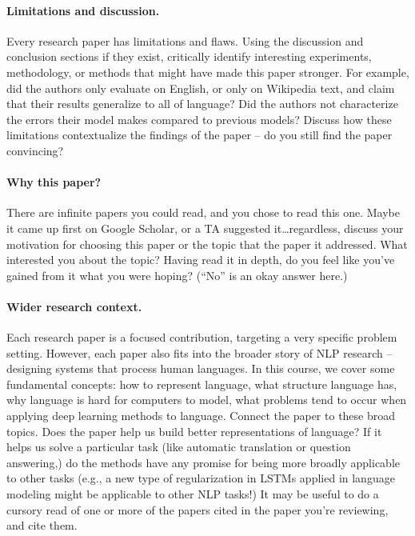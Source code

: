 \documentclass{article}
\begin{document}
\paragraph{Limitations and discussion.}
Every research paper has limitations and flaws.
Using the discussion and conclusion sections if they exist, critically identify interesting experiments, methodology, or methods that might have made this paper stronger.
For example, did the authors only evaluate on English, or only on Wikipedia text, and claim that their results generalize to all of language?
Did the authors not characterize the errors their model makes compared to previous models?
Discuss how these limitations contextualize the findings of the paper -- do you still find the paper convincing?

\paragraph{Why this paper?}
There are infinite papers you could read, and you chose to read this one.
Maybe it came up first on Google Scholar, or a TA suggested it\dots regardless, discuss your motivation for choosing this paper or the topic that the paper it addressed.
What interested you about the topic?
Having read it in depth, do you feel like you've gained from it what you were hoping? (``No'' is an okay answer here.)

\paragraph{Wider research context.}
Each research paper is a focused contribution, targeting a very specific problem setting.
However, each paper also fits into the broader story of NLP research -- designing systems that process human languages.
In this course, we cover some fundamental concepts: how to represent language, what structure language has, why language is hard for computers to model, what problems tend to occur when applying deep learning methods to language.
Connect the paper to these broad topics.
Does the paper help us build better representations of language?
If it helps us solve a particular task (like automatic translation or question answering,) do the methods have any promise for being more broadly applicable to other tasks (e.g., a new type of regularization in LSTMs applied in language modeling might be applicable to other NLP tasks!)
It may be useful to do a cursory read of one or more of the papers cited in the paper you're reviewing, and cite them.
\end{document}
